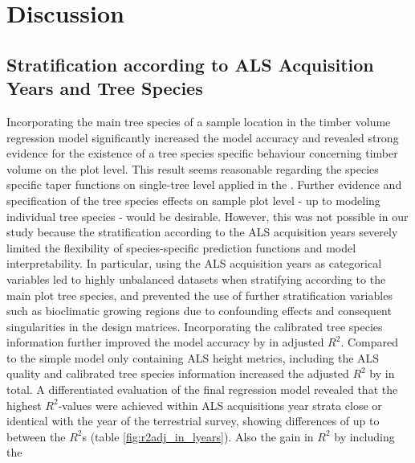 \section{Discussion}
\label{sec:Dis}

\subsection{Stratification according to ALS Acquisition Years and Tree Species}
\label{sec:strat_dis}

Incorporating the main tree species of a sample location in the timber volume regression model significantly increased the model accuracy and revealed strong evidence for the existence of a tree species specific behaviour concerning timber volume on the plot level. This result seems reasonable regarding the species specific taper functions on single-tree level applied in the \bwi{} \citep{kublin2003, kublin2013}. Further evidence and specification of the tree species effects on sample plot level - up to modeling individual tree species - would be desirable. However, this was not possible in our study because the stratification according to the ALS acquisition years severely limited the flexibility of species-specific prediction functions and model interpretability. In particular, using the ALS acquisition years as categorical variables led to highly unbalanced datasets when stratifying according to the main plot tree species, and prevented the use of further stratification variables such as bioclimatic growing regions due to confounding effects and consequent singularities in the design matrices.  Incorporating the calibrated tree species information further improved the model accuracy by  in adjusted $R^2$. Compared to the simple model only containing ALS height metrics, including the ALS quality and calibrated tree species information increased the adjusted $R^2$ by  in total. A differentiated evaluation of the final regression model revealed that the highest $R^2$-values were achieved within ALS acquisitions year strata close or identical with the year of the terrestrial survey, showing differences of up to  between the $R^2$s (table \ref{fig:r2adj_in_lyears}). Also the gain in $R^2$ by including the 